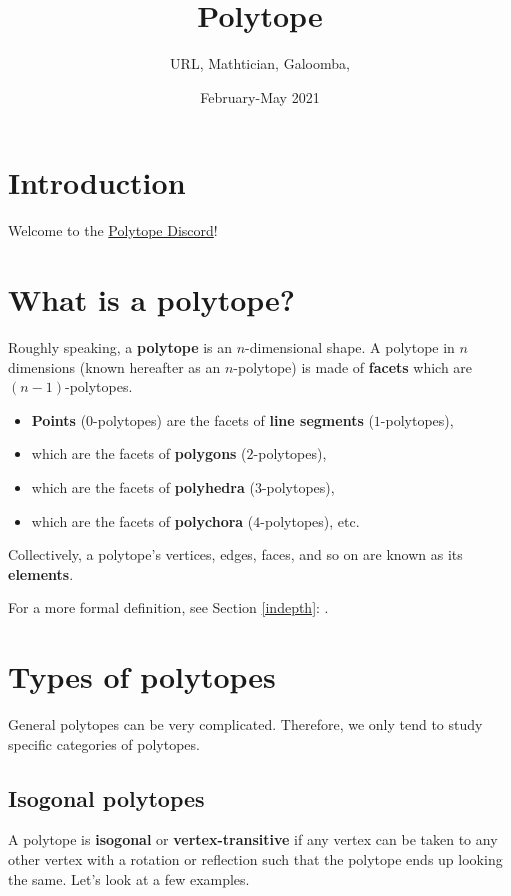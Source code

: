 \documentclass{article}
\title{Polytope}
\author{URL, Mathtician, Galoomba,}
\date{February-May 2021}
\begin{document}
\maketitle

\section{Introduction}
Welcome to the \href{https://discord.gg/invite/zMRu7T4}{Polytope Discord}!

\section{What is a polytope?}
Roughly speaking, a \textbf{polytope} is an $n$-dimensional shape.
A polytope in $n$ dimensions (known hereafter as an $n$-polytope)
is made of \textbf{facets} which are $(n-1)$-polytopes.
\begin{itemize}
\item \textbf{Points} ($0$-polytopes) are the facets of \textbf{line segments} ($1$-polytopes),
\item which are the facets of \textbf{polygons} ($2$-polytopes),
\item which are the facets of \textbf{polyhedra} ($3$-polytopes),
\item which are the facets of \textbf{polychora} ($4$-polytopes), etc.
\end{itemize}
Collectively, a polytope's vertices, edges, faces,
and so on are known as its \textbf{elements}.

For a more formal definition, see Section \ref{indepth}: .

\section{Types of polytopes}

General polytopes can be very complicated. Therefore, we only tend to study
specific categories of polytopes.

\subsection{Isogonal polytopes}
\label{isogonal}

A polytope is \textbf{isogonal} or \textbf{vertex-transitive} if any vertex can be taken to any other
vertex with a rotation or reflection such that the polytope ends up looking the same.
Let's look at a few examples.
\end{document}
